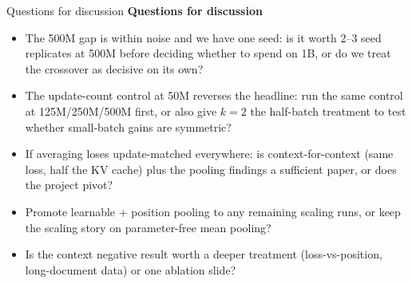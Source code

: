 \documentclass[10pt,aspectratio=169]{beamer}
\begin{document}
\begin{frame}{Questions for discussion}
  \textbf{Questions for discussion}
  \begin{itemize}
    \item The 500M gap is within noise and we have one seed: is it worth
          2--3 seed replicates at 500M before deciding whether to spend on
          1B, or do we treat the crossover as decisive on its own?
    \item The update-count control at 50M reverses the headline: run the
          same control at 125M/250M/500M first, or also give $k{=}2$ the
          half-batch treatment to test whether small-batch gains are
          symmetric?
    \item If averaging loses update-matched everywhere: is
          context-for-context (same loss, half the KV cache) plus the
          pooling findings a sufficient paper, or does the project pivot?
    \item Promote learnable + position pooling to any remaining scaling
          runs, or keep the scaling story on parameter-free mean pooling?
    \item Is the context negative result worth a deeper treatment
          (loss-vs-position, long-document data) or one ablation slide?
  \end{itemize}
\end{frame}
\end{document}

